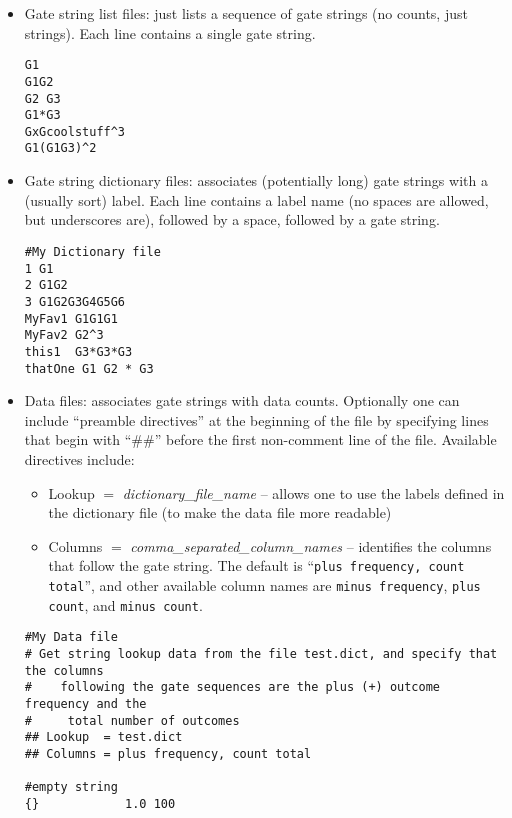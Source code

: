 \documentclass{article}[11pt]
\begin{document}
\begin{itemize}
\item Gate string list files: just lists a sequence of gate strings (no counts, just strings).  Each line contains a single gate string.

\begin{lstlisting}[frame=single,caption=Example gate string list file]
G1
G1G2
G2 G3
G1*G3
GxGcoolstuff^3
G1(G1G3)^2
\end{lstlisting}

\item Gate string dictionary files:  associates (potentially long) gate strings with a (usually sort) label.  Each line contains a label name (no spaces are allowed, but underscores are), followed by a space, followed by a gate string.

\begin{lstlisting}[frame=single,caption=Example gate string dictionary file]
#My Dictionary file
1 G1
2 G1G2
3 G1G2G3G4G5G6
MyFav1 G1G1G1
MyFav2 G2^3
this1  G3*G3*G3
thatOne G1 G2 * G3
\end{lstlisting}

\item Data files:  associates gate strings with data counts.  Optionally one can include ``preamble directives'' at the beginning of the file by specifying lines that begin with ``\#\#'' before the first non-comment line of the file.  Available directives include:
\begin{itemize}
\item Lookup $=$ \emph{dictionary\_file\_name}  -- allows one to use the labels defined in the dictionary file (to make the data file more readable)
\item Columns $=$ \emph{comma\_separated\_column\_names}  -- identifies the columns that follow the gate string.  The default is ``\texttt{plus frequency, count total}'', and other available column names are \texttt{minus frequency}, \texttt{plus count}, and \texttt{minus count}.
\end{itemize}

\begin{lstlisting}[frame=single,caption=Example data file]
#My Data file
# Get string lookup data from the file test.dict, and specify that the columns
#    following the gate sequences are the plus (+) outcome frequency and the
#     total number of outcomes
## Lookup  = test.dict
## Columns = plus frequency, count total

#empty string
{}            1.0 100


\end{lstlisting}
\end{itemize}
\end{document}
